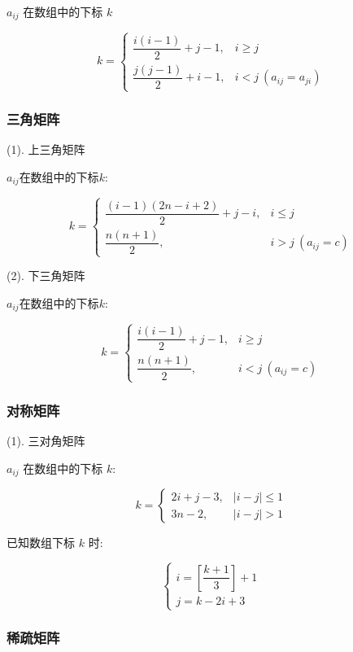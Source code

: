 $a_{ij}$ 在数组中的下标 $k$

$$ k =
\begin{cases}
    \dfrac{i(i-1)}{2}+j-1, & i\geq j\\
    \dfrac{j(j-1)}{2}+i-1, & i<j\ (a_{ij}=a_{ji})
\end{cases}
$$

\subsubsection{三角矩阵}

(1). 上三角矩阵

$a_{ij}$在数组中的下标$k$:

$$ k = 
\begin{cases}
    \dfrac{(i-1)(2n-i+2)}{2}+j-i, & i\leq j\\
    \dfrac{n(n+1)}{2},            & i > j\ (a_{ij}=c)
\end{cases}
$$

(2). 下三角矩阵

$a_{ij}$在数组中的下标$k$:

$$ k = 
\begin{cases}
    \dfrac{i(i-1)}{2}+j-1, & i\geq j\\
    \dfrac{n(n+1)}{2},     & i < j\ (a_{ij}=c)
\end{cases}
$$

\subsubsection{对称矩阵}

(1). 三对角矩阵

$a_{ij}$ 在数组中的下标 $k$:

$$ k = 
\begin{cases}
    2i+j-3, & |i-j| \leq 1\\
    3n-2,   & |i-j| > 1
\end{cases}
$$

已知数组下标 $k$ 时:

$$\begin{cases}
    i = [\dfrac{k+1}{3}]+1\\
    j = k-2i+3
\end{cases}$$

\subsubsection{稀疏矩阵}

